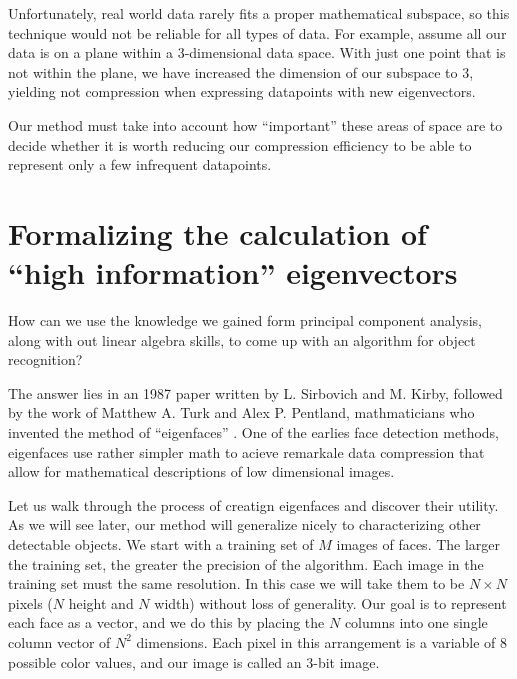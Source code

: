\documentclass[12pt]{report}
\begin{document}
            Unfortunately, real world data rarely fits a proper mathematical subspace, so this technique would not be reliable for all types of data. For example, assume all our data is on a plane within a 3-dimensional data space. With just one point that is not within the plane, we have increased the dimension of our subspace to 3, yielding not compression when expressing datapoints with new eigenvectors.
            
            Our method must take into account how ``important'' these areas of space are to decide whether it is worth reducing our compression efficiency to be able to represent only a few infrequent datapoints.
                
        
        \section{Formalizing the calculation of ``high information'' eigenvectors}
            How can we use the knowledge we gained form principal component analysis, along with out linear algebra skills, to come up with an algorithm for object recognition?

            The answer lies in an 1987 paper written by L. Sirbovich and M. Kirby, followed by the work of Matthew A. Turk and Alex P. Pentland, mathmaticians who invented the method of ``eigenfaces'' \cite{Turk1991}. One of the earlies face detection methods, eigenfaces use rather simpler math to acieve remarkale data compression that allow for mathematical descriptions of low dimensional images.

            Let us walk through the process of creatign eigenfaces and discover their utility. As we will see later, our method will generalize nicely to characterizing other detectable objects. We start with a training set of $M$ images of faces. The larger the training set, the greater the precision of the algorithm. Each image in the training set must the same resolution. In this case we will take them to be $N \times N$ pixels ($N$ height and $N$ width) without loss of generality. Our goal is to represent each face as a vector, and we do this by placing the $N$ columns into one single column vector of $N^2$ dimensions. Each pixel in this arrangement is a variable of $8$  possible color values, and our image is called an 3-bit image.
\end{document}
